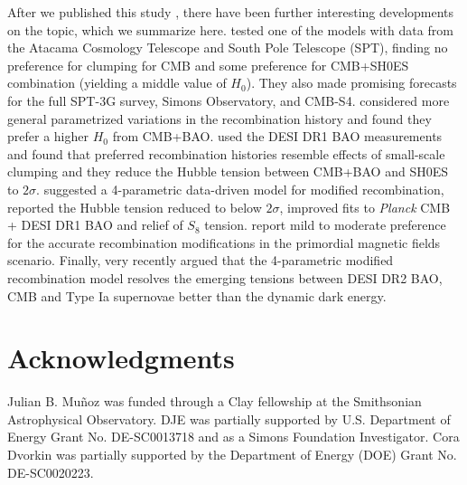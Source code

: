 After we published this study \citep{clumping21}, there have been further interesting developments on the topic, which we summarize here.
\cite{clumping-Planck-ACT-SPT-Galli} tested one of the \cite{JP20} models with data from the Atacama Cosmology Telescope \citep[ACT, earlier considered by][]{clumping-ACT} and South Pole Telescope (SPT), finding no preference for clumping for CMB and some preference for CMB+SH0ES combination (yielding a middle value of $H_0$).
They also made promising forecasts for the full SPT-3G survey, Simons Observatory, and CMB-S4.
\cite{recombination-reconstruction-Lynch} considered more general parametrized variations in the recombination history and found they prefer a higher $H_0$ from CMB+BAO.
\cite{modified-recombination-DESI-Hubble-tension-Lynch} used the DESI DR1 BAO measurements and found that preferred recombination histories resemble effects of small-scale clumping and they reduce the Hubble tension between CMB+BAO and SH0ES to $2\sigma$.
\cite{modified-recombination-Hubble-tension-Mirpoorian} suggested a 4-parametric data-driven model for modified recombination, reported the Hubble tension reduced to below $2\sigma$, improved fits to {\it Planck} CMB + DESI DR1 BAO and relief of $S_8$ tension.
\cite{PMF-clumping-Hubble-tension-2025} report mild to moderate preference for the accurate recombination modifications in the primordial magnetic fields scenario.
Finally, \cite{DESI-DR2-BAO-modified-recombination-Mirpoorian} very recently argued that the 4-parametric modified recombination model resolves the emerging tensions between DESI DR2 BAO, CMB and Type Ia supernovae better than the dynamic dark energy.

\section*{Acknowledgments}

Julian B. Mu\~noz was funded through a Clay fellowship at the Smithsonian Astrophysical Observatory.
DJE was partially supported by U.S. Department of Energy Grant No. DE-SC0013718 and as a Simons Foundation Investigator.
Cora Dvorkin was partially supported by the Department of Energy (DOE) Grant No. DE-SC0020223.